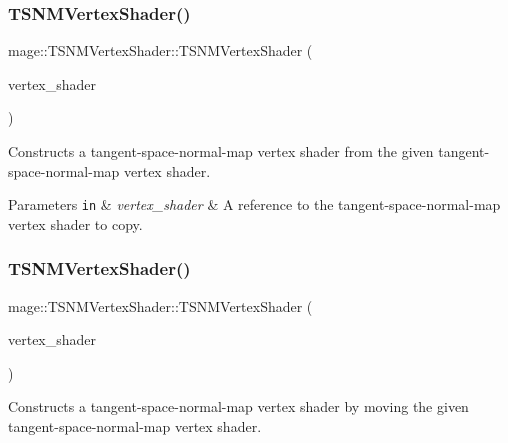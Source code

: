 \subsubsection{\texorpdfstring{T\+S\+N\+M\+Vertex\+Shader()}{TSNMVertexShader()}\hspace{0.1cm}{\footnotesize\ttfamily [5/6]}}
{\footnotesize\ttfamily mage\+::\+T\+S\+N\+M\+Vertex\+Shader\+::\+T\+S\+N\+M\+Vertex\+Shader (\begin{DoxyParamCaption}\item[{const \hyperlink{classmage_1_1_t_s_n_m_vertex_shader}{T\+S\+N\+M\+Vertex\+Shader} \&}]{vertex\+\_\+shader }\end{DoxyParamCaption})\hspace{0.3cm}{\ttfamily [delete]}}

Constructs a tangent-\/space-\/normal-\/map vertex shader from the given tangent-\/space-\/normal-\/map vertex shader.


\begin{DoxyParams}[1]{Parameters}
\mbox{\tt in}  & {\em vertex\+\_\+shader} & A reference to the tangent-\/space-\/normal-\/map vertex shader to copy. \\
\hline
\end{DoxyParams}
\hypertarget{classmage_1_1_t_s_n_m_vertex_shader_a3c4a072e8a907437e4dfc15835253da5}{}\label{classmage_1_1_t_s_n_m_vertex_shader_a3c4a072e8a907437e4dfc15835253da5} 
\subsubsection{\texorpdfstring{T\+S\+N\+M\+Vertex\+Shader()}{TSNMVertexShader()}\hspace{0.1cm}{\footnotesize\ttfamily [6/6]}}
{\footnotesize\ttfamily mage\+::\+T\+S\+N\+M\+Vertex\+Shader\+::\+T\+S\+N\+M\+Vertex\+Shader (\begin{DoxyParamCaption}\item[{\hyperlink{classmage_1_1_t_s_n_m_vertex_shader}{T\+S\+N\+M\+Vertex\+Shader} \&\&}]{vertex\+\_\+shader }\end{DoxyParamCaption})\hspace{0.3cm}{\ttfamily [default]}}

Constructs a tangent-\/space-\/normal-\/map vertex shader by moving the given tangent-\/space-\/normal-\/map vertex shader.


